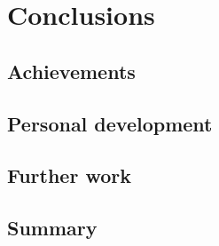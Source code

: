 \chapter{Conclusions}
\label{cha:conclusions}

\section{Achievements}

\section{Personal development}

\section{Further work}

\section{Summary}